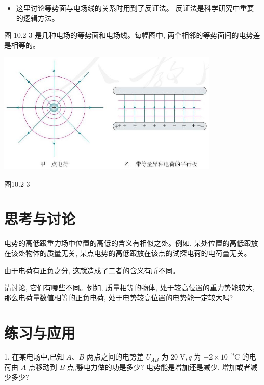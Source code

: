 \documentclass[10pt]{article}
\begin{document}
\begin{mdframed}

\begin{itemize}
\item 这里讨论等势面与电场线的关系时用到了反证法。 反证法是科学研究中重要的逻辑方法。
\end{itemize}

\end{mdframed}

图 10.2-3 是几种电场的等势面和电场线。每幅图中, 两个相邻的等势面间的电势差是相等的。

\begin{center}
\includegraphics[max width=0.8\textwidth]{images/01911d5f-8e38-70c0-b5b8-2b399bd115b6_38_786162.jpg}
\end{center}

图10.2-3

\section*{思考与讨论}

电势的高低跟重力场中位置的高低的含义有相似之处。例如, 某处位置的高低跟放在该处物体的质量无关, 某点电势的高低跟放在该点的试探电荷的电荷量无关。

由于电荷有正负之分, 这就造成了二者的含义有所不同。

请讨论, 它们有哪些不同。例如, 质量相等的物体, 处于较高位置的重力势能较大, 那么电荷量数值相等的正负电荷, 处于电势较高位置的电势能一定较大吗?

\section*{练习与应用}

1. 在某电场中,已知 \(A\text{、}B\) 两点之间的电势差 \({U}_{AB}\) 为 \({20}\mathrm{\;V},q\) 为 \(- 2 \times {10}^{-9}\mathrm{C}\) 的电荷由 \(A\) 点移动到 \(B\) 点,静电力做的功是多少? 电势能是增加还是减少, 增加或者减少多少?
\end{document}

